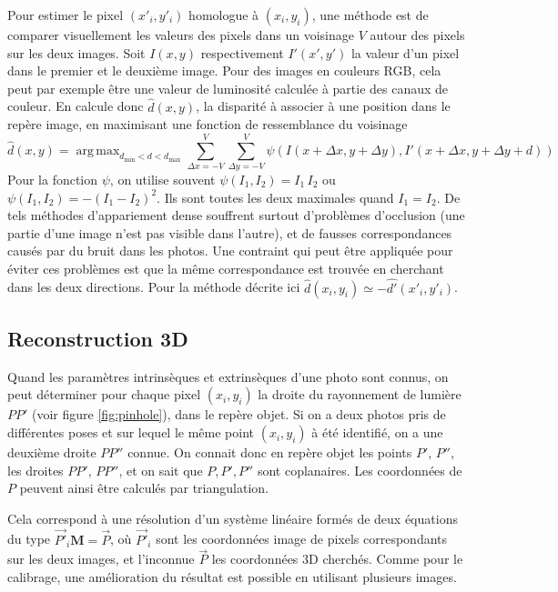\documentclass[a4paper,10pt]{scrreprt}
\DeclareMathOperator*{\argmax}{arg\,max}
\begin{document}
Pour estimer le pixel $(x'_i, y'_i)$ homologue à $(x_i, y_i)$, une méthode est de comparer visuellement les valeurs des pixels dans un voisinage $V$ autour des pixels sur les deux images. Soit $I(x, y)$ respectivement $I'(x', y')$ la valeur d'un pixel dans le premier et le deuxième image. Pour des images en couleurs RGB, cela peut par exemple être une valeur de luminosité calculée à partie des canaux de couleur. En calcule donc $\hat{d}(x, y)$, la disparité à associer à une position dans le repère image, en maximisant une fonction de ressemblance du voisinage
\begin{equation}
	\hat{d}(x, y) = \argmax_{d_{\min} < d <  d_{\max}} \sum_{\Delta x=-V}^{V} \sum_{\Delta y=-V}^{V} \psi(I(x + \Delta x, y + \Delta y), I'(x + \Delta x, y + \Delta y + d))
\end{equation}
Pour la fonction $\psi$, on utilise souvent $\psi(I_1, I_2) = I_1 \, I_2$ ou $\psi(I_1, I_2) = -(I_1 - I_2)^2$. Ils sont toutes les deux maximales quand $I_1 = I_2$. De tels méthodes d'appariement dense souffrent surtout d'problèmes d'occlusion (une partie d'une image n'est pas visible dans l'autre), et de fausses correspondances causés par du bruit dans les photos. Une contraint qui peut être appliquée pour éviter ces problèmes est que la même correspondance est trouvée en cherchant dans les deux directions. Pour la méthode décrite ici $\hat{d}(x_i, y_i) \simeq -\hat{d'}(x'_i, y'_i)$.

\subsection{Reconstruction 3D}
Quand les paramètres intrinsèques et extrinsèques d'une photo sont connus, on peut déterminer pour chaque pixel $(x_i, y_i)$ la droite du rayonnement de lumière $P P'$ (voir figure \ref{fig:pinhole}), dans le repère objet. Si on a deux photos pris de différentes poses et sur lequel le même point $(x_i, y_i)$ à été identifié, on a une deuxième droite $P P''$ connue. On connait donc en repère objet les points $P'$, $P''$, les droites $P P'$, $P P''$, et on sait que $P, P', P''$ sont coplanaires. Les coordonnées de $P$ peuvent ainsi être calculés par triangulation.

Cela correspond à une résolution d'un système linéaire formés de deux équations du type $\vec{P'}_{i} \mathbf{M} = \vec{P}$, où $\vec{P'}_i$ sont les coordonnées image de pixels correspondants sur les deux images, et l'inconnue $\vec{P}$ les coordonnées 3D cherchés. Comme pour le calibrage, une amélioration du résultat est possible en utilisant plusieurs images.
\end{document}
